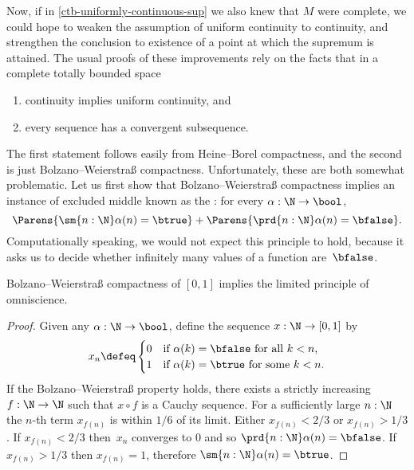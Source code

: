 Now, if in \cref{ctb-uniformly-continuous-sup} we also knew that $M$ were complete, we
could hope to weaken the assumption of uniform continuity to continuity, and strengthen
the conclusion to existence of a point at which the supremum is attained. The usual proofs
of these improvements rely on the facts that in a complete totally bounded space
%
\begin{enumerate}
\item continuity implies uniform continuity, and
\item every sequence has a convergent subsequence.
\end{enumerate}
%
The first statement follows easily from Heine--Borel compactness, and the second is just
Bolzano--Weierstra\ss{} compactness.
%
Unfortunately, these are both somewhat problematic. Let
us first show that Bolzano--Weierstra\ss{} compactness implies an instance of excluded middle
known as the :
%
%
for every $\alpha : \N \to \bool$,
%
\begin{equation} \label{eq:lpo}
  \Parens{\sm{n : \N} \alpha(n) = \btrue} +
  \Parens{\prd{n : \N} \alpha(n) = \bfalse}.
\end{equation}
%
Computationally speaking, we would not expect this principle to hold, because it asks us to decide
whether infinitely many values of a function are~$\bfalse$.

\begin{thm} \label{analysis-bw-lpo}
  Bolzano--Weierstra\ss{} compactness of $[0,1]$ implies the limited principle of omniscience.
\end{thm}

\begin{proof}
  Given any $\alpha : \N \to \bool$, define the sequence $x : \N \to [0,1]$ by
  \begin{equation*}
    x_n \defeq
    \begin{cases}
      0 & \text{if $\alpha(k) = \bfalse$ for all $k < n$,}\\
      1 & \text{if $\alpha(k) = \btrue$ for some $k < n$}.
    \end{cases}
  \end{equation*}
  If the Bolzano--Weierstra\ss{} property holds, there exists a strictly increasing $f : \N \to
  \N$ such that $x \circ f$ is a Cauchy sequence. For a sufficiently large $n :
  \N$ the $n$-th term $x_{f(n)}$ is within $1/6$ of its limit. Either $x_{f(n)} < 2/3$ or
  $x_{f(n)} > 1/3$. If $x_{f(n)} < 2/3$ then~$x_n$ converges to $0$ and so $\prd{n : \N}
  \alpha(n) = \bfalse$. If $x_{f(n)} > 1/3$ then $x_{f(n)} = 1$, therefore $\sm{n : \N}
  \alpha(n) = \btrue$.
\end{proof}

